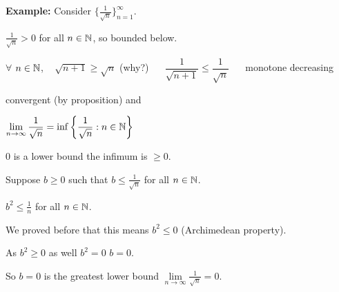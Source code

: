 \documentclass[10pt,aspectratio=169]{beamer}
\begin{document}
\begin{frame}

\textbf{Example:}
Consider $\bigl\{ \frac{1}{\sqrt{n}} \bigr\}_{n=1}^\infty$.

\medskip
\pause

$\frac{1}{\sqrt{n}} > 0$ for all $n \in {\mathbb{N}}$, so bounded below.

\pause
$\forall$ $n \in {\mathbb{N}}$, ~
$\sqrt{n+1} \geq \sqrt{n}$ (why?)
\pause
~\thus~
$\dfrac{1}{\sqrt{n+1}} \leq \dfrac{1}{\sqrt{n}}$
\pause
~\thus~
monotone decreasing

\medskip
\pause
\thus \quad convergent (by proposition) and

\medskip
\pause

$\displaystyle
\lim_{n\to \infty} \frac{1}{\sqrt{n}}
=
\inf \left\{ \frac{1}{\sqrt{n}} : n \in {\mathbb{N}} \right\}$

\medskip
\pause

$0$ is a lower bound \wthus the infimum is $\geq 0$.

\medskip
\pause

Suppose $b \geq 0$ such that 
$b \leq \frac{1}{\sqrt{n}}$ for all $n \in {\mathbb{N}}$.

\pause
\thus \quad
$b^2 \leq \frac{1}{n}$ for all $n \in {\mathbb{N}}$.

\pause
\medskip

We proved before that this means $b^2 \leq 0$ (Archimedean property).

\pause
\medskip

As $b^2 \geq 0$ as well \wthus $b^2 = 0$ \pause \wthus $b=0$.

\pause
\medskip

So $b=0$ is the greatest lower bound \pause\wthus
$\lim\limits_{n\to\infty} \frac{1}{\sqrt{n}} = 0$.
\end{frame}
\end{document}
